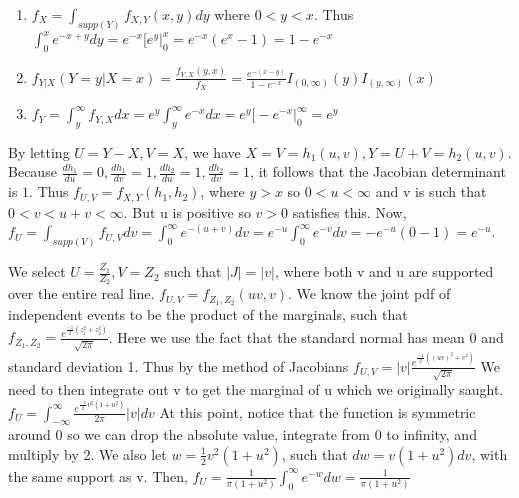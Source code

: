 \documentclass{article}
\begin{document}
\begin{prob}
	\begin{enumerate}
\item $f_X=\int_{supp(Y)}f_{X,Y}(x,y)dy$ where $0<y<x$. Thus $\int_{0}^{x}e^{-x+y}dy=e^{-x}\big[e^{y}\big|^{x}_{0}=e^{-x}(e^x-1)=1-e^{-x}$
	\item $f_{Y|X}(Y=y|X=x)=\frac{f_{Y,X}(y,x)}{f_X}=\frac{e^{-(x-y)}}{1-e^{-x}}I_{(0,\infty)}(y)I_{(y,\infty)}(x)$

	\item $f_Y=\int_{y}^{\infty}f_{Y,X}dx=e^{y}\int_{y}^{\infty}e^{-x}dx=e^y\big[-e^{-x}\big|^{\infty}_{0}=e^y$
	\end{enumerate}
\end{prob}

\begin{prob}
	By letting $U=Y-X, V=X$, we have $X=V=h_1(u,v), Y=U+V=h_2(u,v)$. Because $\frac{dh_1}{du}=0,\frac{dh_1}{dv}=1,\frac{dh_2}{du}=1,\frac{dh_2}{dv}=1$, it follows that the Jacobian determinant is $1$. Thus $f_{U,V}=f_{X,Y}(h_1, h_2)$, where $y>x$ so $0<u<\infty$ and v is such that $0<v<u+v<\infty$. But u is positive so $v>0$ satisfies this.
	Now, $f_U=\int_{supp(V)}f_{U,V}dv=\int_{0}^{\infty}e^{-(u+v)}dv=e^{-u}\int_{0}^{\infty}e^{-v}dv=-e^{-u}(0-1)=e^{-u}$.
\end{prob}

\begin{prob}
	We select $U=\frac{Z_1}{Z_2}, V=Z_2$ such that $|J|=|v|$, where both v and u are supported over the entire real line.
	$f_{U,V}=f_{Z_1, Z_2}(uv, v)$. We know the joint pdf of independent events to be the product of the marginals, such that $f_{Z_1, Z_2}=\frac{e^{\frac{-1}{2}(z_1^2+z_2^2)}}{\sqrt{2\pi}}$. Here we use the fact that the standard normal has mean 0 and standard deviation 1.
	Thus by the method of Jacobians $f_{U,V}=|v|\frac{e^{\frac{-1}{2}((uv)^2+v^2)}}{\sqrt{2\pi}}$
	We need to then integrate out v to get the marginal of u which we originally saught.
	$f_U=\int_{-\infty}^{\infty}\frac{e^{\frac{-1}{2}v^2(1+u^2)}}{2\pi}|v|dv$
	At this point, notice that the function is symmetric around 0 so we can drop the absolute value, integrate from 0 to infinity, and multiply by 2. We also let $w=\frac{1}{2}v^2(1+u^2)$, such that $dw=v(1+u^2)dv$, with the same support as v.
	Then, $f_U=\frac{1}{\pi (1+u^2)}\int^{\infty}_{0}e^{-w}dw=\frac{1}{\pi(1+u^2)}$
\end{prob}
\end{document}
